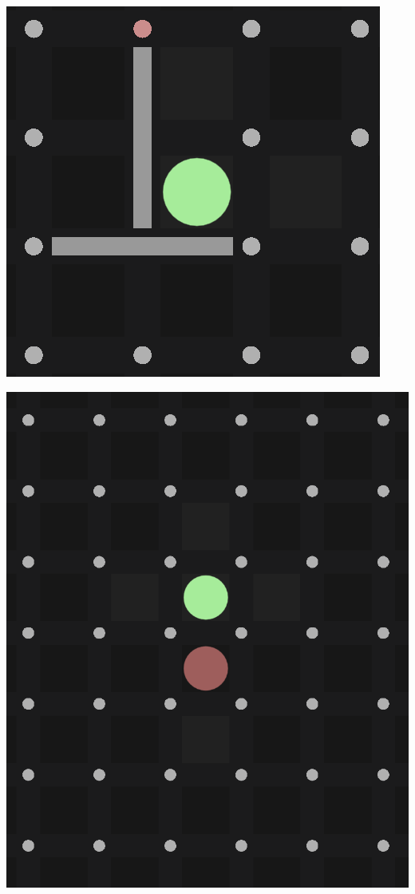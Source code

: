 \documentclass[progress]{cmpreport}
\begin{document}
\begin{minipage}[b]{0.45\textwidth}
    \centering
    \includegraphics[width=\textwidth]{images/fence_placement.png}
    \label{fig:fence_placement}
\end{minipage}%
\hfill
\begin{minipage}[b]{0.45\textwidth}
    \centering
    \includegraphics[width=\textwidth]{images/pawn_leaping.png}
    \label{fig:pawn_leaping}
\end{minipage}
\end{document}
